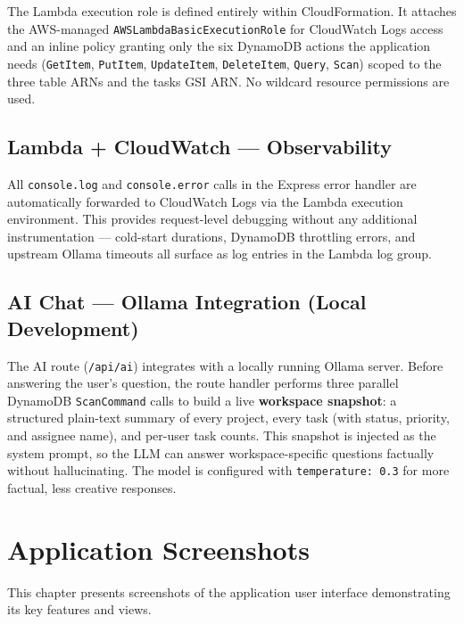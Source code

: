 \documentclass[12pt,a4paper]{report}
\begin{document}
The Lambda execution role is defined entirely within CloudFormation. It attaches the
AWS-managed \texttt{AWSLambdaBasicExecutionRole} for CloudWatch Logs access and an
inline policy granting only the six DynamoDB actions the application needs
(\texttt{GetItem}, \texttt{PutItem}, \texttt{UpdateItem}, \texttt{DeleteItem},
\texttt{Query}, \texttt{Scan}) scoped to the three table ARNs and the tasks GSI ARN.
No wildcard resource permissions are used.

\section{Lambda + CloudWatch — Observability}

All \texttt{console.log} and \texttt{console.error} calls in the Express error handler
are automatically forwarded to CloudWatch Logs via the Lambda execution environment.
This provides request-level debugging without any additional instrumentation — cold-start
durations, DynamoDB throttling errors, and upstream Ollama timeouts all surface as
log entries in the Lambda log group.

\section{AI Chat — Ollama Integration (Local Development)}

The AI route (\texttt{/api/ai}) integrates with a locally running Ollama server. Before
answering the user's question, the route handler performs three parallel DynamoDB
\texttt{ScanCommand} calls to build a live \textbf{workspace snapshot}: a structured
plain-text summary of every project, every task (with status, priority, and assignee
name), and per-user task counts. This snapshot is injected as the system prompt, so the
LLM can answer workspace-specific questions factually without hallucinating. The model
is configured with \texttt{temperature: 0.3} for more factual, less creative responses.

\chapter{Application Screenshots}

This chapter presents screenshots of the application user interface demonstrating
its key features and views.
\end{document}
